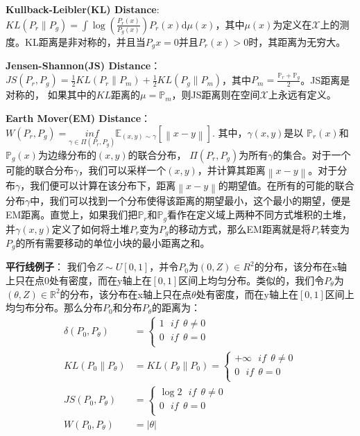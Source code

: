 \textbf{Kullback-Leibler(KL) Distance}: $KL({P}_r \parallel {P}_g) = \int \log (\frac{P_r(x)}{P_g(x)})P_r(x) \mathrm{d} \mu(x) $，其中$\mu(x)$为定义在$\mathcal{X}$上的测度。KL距离是非对称的，并且当$P_g{x} = 0$并且$P_r(x) > 0$时，其距离为无穷大。

\textbf{Jensen-Shannon(JS) Distance}：$JS({P}_r, {P}_g) = \frac{1}{2}KL({P}_r \parallel {P}_m) + \frac{1}{2}KL({P}_g \parallel {P}_m)$，其中${P}_m = \frac{\mathbb{P}_r + \mathbb{P}_g}{2}$。JS距离是对称的，{\color{red} 如果其中的$KL$距离的$\mu = \mathbb{P}_m$，则JS距离则在空间$\mathcal{X}$上永远有定义}。

\textbf{Earth Mover(EM) Distance}：$W({P}_r,{P}_g) = \underset{\gamma \in \Pi({P}_r, {P}_g)}{inf} \mathbb{E}_{(x,y) \sim \gamma} [\left \| x-y \right \|]$. 其中，$\gamma(x,y)$是以 $\mathbb{P}_r(x)$和$\mathbb{P}_g(x)$为边缘分布的$(x,y)$的联合分布， $\Pi({P}_r, {P}_g)$为所有$\gamma$的集合。对于一个可能的联合分布$\gamma$，我们可以采样一个$(x,y)$，并计算其距离$\left \| x-y \right \|$。对于分布$\gamma$，我们便可以计算在该分布下，距离$\left \| x-y \right \|$的期望值。在所有的可能的联合分布$\gamma$中，我们可以找到一个分布使得该距离的期望最小，这个最小的期望，便是EM距离。直觉上，如果我们把$\mathbb{P}_r$和$\mathbb{P}_g$看作在定义域上两种不同方式堆积的土堆，并$\gamma(x,y)$定义了如何将土堆${P}_r$变为${P}_g$的移动方式，那么EM距离就是将${P}_r$转变为${P}_g$的所有需要移动的单位小块的最小距离之和。

\textbf{平行线例子}： 我们令$Z \sim U[0,1]$，并令${P}_0$为$(0, Z) \in {R}^2$的分布，该分布在x轴上只在点0处有密度，而在y轴上在$[0,1]$区间上均匀分布。类似的，我们令${P}_\theta$为$(\theta, Z) \in \mathbb{R}^2$的分布，该分布在x轴上只在点$\theta$处有密度，而在y轴上在$[0,1]$区间上均匀布分布。那么分布${P}_0$和分布${P}_\theta$的距离为：
\begin{displaymath}
\begin{split}
\delta({P}_0, {P}_\theta) &= 
\begin{cases}  
1 ~~~ if ~~\theta \neq 0\\
0 ~~~ if ~~ \theta = 0\\
\end{cases}\\
KL({P}_0 \parallel {P}_\theta) &= KL({P}_\theta \parallel {P}_0) = 
\begin{cases}  
+ \infty ~~~ if ~~\theta \neq 0\\
0 ~~~ if ~~ \theta = 0\\
\end{cases}\\
JS({P}_0, {P}_\theta) &= 
\begin{cases}  
\log 2 ~~~ if ~~\theta \neq 0\\
0 ~~~ if ~~ \theta = 0\\
\end{cases}\\
W({P}_0, {P}_\theta) &= |\theta|\\
\end{split}
\end{displaymath}

